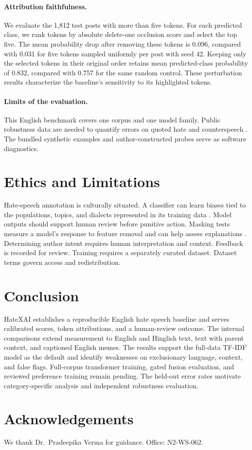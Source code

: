 \documentclass[11pt]{article}
\begin{document}
\paragraph{Attribution faithfulness.}
We evaluate the 1,812 test posts with more than five tokens. For each predicted class, we rank tokens by absolute delete-one occlusion score and select the top five. The mean probability drop after removing these tokens is 0.096, compared with 0.031 for five tokens sampled uniformly per post with seed 42. Keeping only the selected tokens in their original order retains mean predicted-class probability of 0.832, compared with 0.757 for the same random control. These perturbation results characterize the baseline's sensitivity to its highlighted tokens.

\paragraph{Limits of the evaluation.}
This English benchmark covers one corpus and one model family. Public robustness data are needed to quantify errors on quoted hate and counterspeech \cite{gligoric2024use}. The bundled synthetic examples and author-constructed probes serve as software diagnostics.

\ifdefined\HateXAIInternal

\fi

\section{Ethics and Limitations}

Hate-speech annotation is culturally situated. A classifier can learn biases tied to the populations, topics, and dialects represented in its training data \cite{sap2019racial,wiegand2019biased}. Model outputs should support human review before punitive action. Masking tests measure a model's response to feature removal and can help assess explanations \cite{jacovi2020faithfulness}. Determining author intent requires human interpretation and context. Feedback is recorded for review. Training requires a separately curated dataset. Dataset terms govern access and redistribution.

\section{Conclusion}

HateXAI establishes a reproducible English hate speech baseline and serves calibrated scores, token attributions, and a human-review outcome.
\ifdefined\HateXAIInternal
The internal comparisons extend measurement to English and Hinglish text, text with parent context, and captioned English memes. The results support the full-data TF-IDF model as the default and identify weaknesses on exclusionary language, context, and false flags. Full-corpus transformer training, gated fusion evaluation, and reviewed preference training remain pending.
\else
The held-out error rates motivate category-specific analysis and independent robustness evaluation.
\fi

\section*{Acknowledgements}
We thank Dr.\ Pradeepika Verma for guidance. Office: N2-WS-062.


\end{document}
